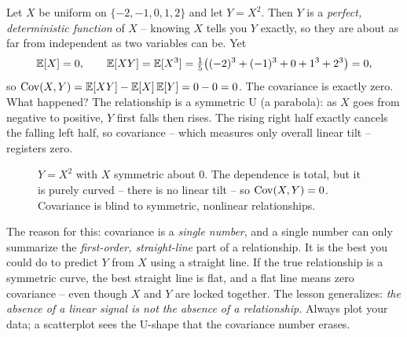 \begin{example}
\label{ch14:ex-ushape}
Let $X$ be uniform on $\{-2, -1, 0, 1, 2\}$ and let $Y = X^2$. Then $Y$ is a
\emph{perfect, deterministic function} of $X$ -- knowing $X$ tells you $Y$ exactly,
so they are about as far from independent as two variables can be. Yet
\[
\operatorname{\mathbb{E}}[X] = 0, \qquad
\operatorname{\mathbb{E}}[XY] = \operatorname{\mathbb{E}}[X^3] = \tfrac{1}{5}\big((-2)^3 + (-1)^3 + 0 + 1^3 + 2^3\big) = 0,
\]
so $\operatorname{Cov}(X, Y) = \operatorname{\mathbb{E}}[XY] - \operatorname{\mathbb{E}}[X]\operatorname{\mathbb{E}}[Y] = 0 - 0 = 0$. The covariance is exactly zero.
What happened? The relationship is a symmetric U (a parabola): as $X$ goes from
negative to positive, $Y$ first falls then rises. The rising right half exactly
cancels the falling left half, so covariance -- which measures only overall
linear tilt -- registers zero.
\end{example}

\begin{figure}[H]
\centering
{}
\caption{$Y = X^2$ with $X$ symmetric about $0$. The dependence is total, but it is
purely curved -- there is no linear tilt -- so $\operatorname{Cov}(X, Y) = 0$. Covariance is
blind to symmetric, nonlinear relationships.}
\label{ch14:fig-ushape}
\end{figure}

\begin{happeningbox}
The reason for this: covariance is a \emph{single number}, and a single
number can only summarize the \emph{first-order, straight-line} part of a
relationship. It is the best you could do to predict $Y$ from $X$ using a straight line. If the true relationship is a symmetric curve,
the best straight line is flat, and a flat line means zero covariance -- even though
$X$ and $Y$ are locked together. The lesson generalizes: \emph{the absence of a
linear signal is not the absence of a relationship.} Always plot your data; a
scatterplot sees the U-shape that the covariance number erases.
\end{happeningbox}

